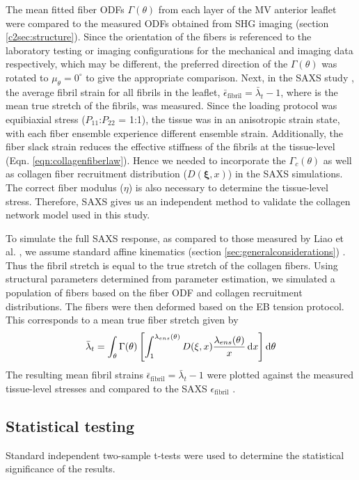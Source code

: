     The mean fitted fiber ODFs $\Gamma(\theta)$ from each layer of the MV anterior leaflet were compared to the measured ODFs obtained from SHG imaging (section \ref{c2sec:structure}). Since the orientation of the fibers is referenced to the laboratory testing or imaging configurations for the mechanical and imaging data respectively, which may be different, the preferred direction of the $\Gamma(\theta)$ was rotated to $\mu_\theta = 0^\circ$ to give the appropriate comparison. Next, in the SAXS study \cite{liao_relation_2007}, the average fibril strain for all fibrils in the leaflet, $\bar{\epsilon}_\mathrm{fibril} = \bar{\lambda}_t - 1$, where  is the mean true stretch of the fibrils, was measured. Since the loading protocol was equibiaxial stress ($P_{11}$:$P_{22}$ = 1:1), the tissue was in an anisotropic strain state, with each fiber ensemble experience different ensemble strain. Additionally, the fiber slack strain reduces the effective stiffness of the fibrils at the tissue-level (Eqn. \ref{eqn:collagenfiberlaw}). Hence we needed to incorporate the $\Gamma_c(\theta)$ as well as collagen fiber recruitment distribution ($D(\mathbf{\xi}, x)$) in the SAXS simulations. The correct fiber modulus ($\eta$) is also necessary to determine the tissue-level stress. Therefore, SAXS gives us an independent method to validate the collagen network model used in this study.
    
    
    To simulate the full SAXS response, as compared to those measured by Liao et al. \cite{liao_relation_2007}, we assume standard affine kinematics (section \ref{sec:generalconsiderations}) \cite{lee_presence_2015}. Thus the fibril stretch is equal to the true stretch of the collagen fibers. Using structural parameters determined from parameter estimation, we simulated a population of fibers based on the fiber ODF and collagen recruitment distributions. The fibers were then deformed based on the EB tension protocol. This corresponds to a mean true fiber stretch given by
        \begin{equation}\label{c2:eqn:fibrilstrain}
        \begin{aligned}
        \bar{\lambda}_t = \int_\theta\Gamma(\theta)\left[\int_1^{\lambda_{ens}(\theta)}D(\mathbf{\xi},x)\frac{\lambda_{ens}(\theta)}{x}\dif x\right]\dif \theta
        \end{aligned}
        \end{equation}
    The resulting mean fibril strains $\bar{\epsilon}_\mathrm{fibril} = \bar{\lambda}_t-1$ were plotted against the measured tissue-level stresses and compared to the SAXS $\epsilon_\mathrm{fibril}$ \cite{liao_relation_2007}.


\subsection{Statistical testing}

    Standard independent two-sample t-tests were used to determine the statistical significance of the results.



    
    
    
    